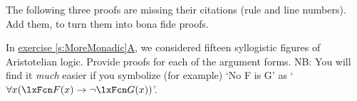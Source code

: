 \problempart 
\label{pr.justifyFOLproof}
The following three proofs are missing their citations (rule and line numbers). Add them, to turn them into bona fide proofs.
\begin{compactlist}
\item \begin{fitchproof}
	\open
	\close
{} {}
\end{fitchproof}

\item \begin{fitchproof}
 {}
 {}
\end{fitchproof}

\item \begin{fitchproof}
\open
\close
{}
\end{fitchproof}
\end{compactlist}

\problempart
\label{pr.BarbaraEtc.proof1}
In \hyperref[pr.BarbaraEtc]{exercise \ref*{s:MoreMonadic}A}, we
considered fifteen syllogistic figures of Aristotelian logic. Provide
proofs for each of the argument forms. NB: You will find it
\emph{much} easier if you symbolize (for example) `No F is G' as
`$\forall x (\atom{F}{x} \eif \enot \atom{G}{x})$'.

\

